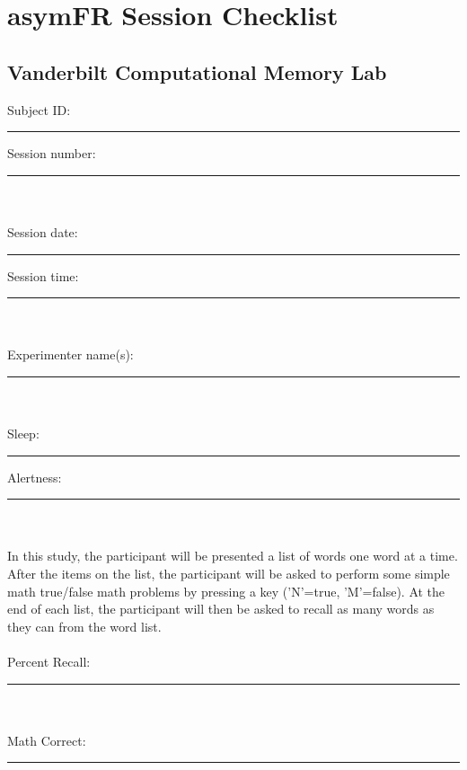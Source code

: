 \documentclass[12pt]{article}
\begin{document}
\setlength{\parindent}{0in}
\renewcommand{\labelitemi}{$\bigcirc$}
\renewcommand{\labelitemii}{$\bigcirc$}

\section*{asymFR Session Checklist}
\subsection*{Vanderbilt Computational Memory Lab}
\vspace{0.25cm}
Subject ID: \rule{1in}{0.4mm} Session number: \rule{1in}{0.4mm} \\
\vspace{0.25cm} \\
Session date: \rule{1in}{0.4mm} \hspace{0.1cm} Session time: \rule{1in}{0.4mm} \\
\vspace{0.25cm} \\
Experimenter name(s): \rule{3in}{0.4mm} \\
\vspace{0.25cm} \\
Sleep: \rule{1in}{0.4mm} \hspace{0.1cm} Alertness: \rule{1in}{0.4mm} \\
\vspace{0.25cm} \\
In this study, the participant will be presented a list of words one
word at a time.  After the items on the list, the participant will be
asked to perform some simple math true/false math problems by pressing
a key ('N'=true, 'M'=false).  At the end of each list, the participant
will then be asked to recall as many words as they can from the word
list. \\
\vspace{5cm} \\
Percent Recall: \rule{1in}{0.4mm} \\
\vspace{0.05cm} \\
Math Correct: \rule{1in}{0.4mm}

\newpage
%
\end{document}
